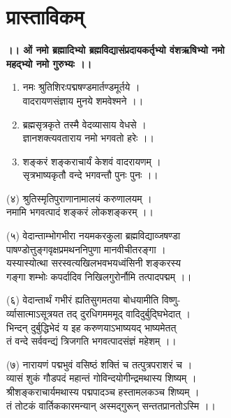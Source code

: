 ﻿\chapter{प्रास्ताविकम्}

\begin{center}
 \textbf{।। ओं नमो ब्रह्मादिभ्यो ब्रह्मविद्यासंप्रदायकर्तृभ्यो वंशऋषिभ्यो नमो \\ महद्भ्यो नमो गुरुभ्यः ।।}
\end{center}

\begin{center}
\begin{enumerate}
\item
नमः श्रुतिशिरःपद्मषण्डमार्तण्डमूर्तये ।\\
 वादरायणसंज्ञाय मुनये शमवेश्मने ।।
\item
 ब्रह्मसृत्रकृते तस्मै वेदव्यासाय वेधसे ।\\
 ज्ञानशक्त्यवताराय नमो भगवतो हरेः ।।
\item
 शङ्करं शङ्कराचार्यं केशवं वादरायणम् ।\\
 सृत्रभाष्यकृतौ वन्दे भगवन्तौ पुनः पुनः ।।
 \end{enumerate}
\end{center} 

 (४) श्रुतिस्मृतिपुराणानामालयं करुणालयम् ।\\
 नमामि भगवत्पादं शङ्करं लोकशङ्करम् ।। 
 
 (५) वेदान्ताम्भोगभीरा नयमकरकुला ब्रह्मविद्याव्जषण्डा \\
 पाषण्डोत्तुङ्गवृक्षप्रमथननिपुणा मानवीचीतरङ्गा ।\\
 यस्यास्योत्था सरस्वत्यखिलभवभयध्वंसिनी शङ्करस्य \\
 गङ्गा शम्भोः कपर्दादिव निखिलगुरोर्नौमि तत्पादपद्मम् ।। 
 
 (६) वेदान्तार्थं गभीरं ह्यतिसुगमतया बोधयामीति विष्णु-\\
 र्व्यासात्माऽसूत्रयत तद् दुरधिगमममूद् वादिदुर्बुद्घिभेदात् ।\\
 भिन्दन् दुर्बुद्धिभेदं य इह करुणयाऽभाष्ययद् भाष्यमेतत् \\
 तं वन्दे सर्ववन्द्यं त्रिजगति भगवत्पादसंज्ञं महेशम् ।। 
 
 (७) नारायणं पद्मभुवं वसिष्ठं शक्तिं च तत्पुत्रपराशरं च । \\
 व्यासं शुकं गौडपदं महान्तं गोविन्दयोगीन्द्रमथास्य शिष्यम् ।\\
श्रीशङ्कराचार्यमथास्य पद्मपादञ्च हस्तामलकञ्च शिष्यम् ।\\
तं तोटकं वार्तिककारमन्यान् अस्मद्गुरून् सन्ततप्रानतोऽस्मि ।। 

